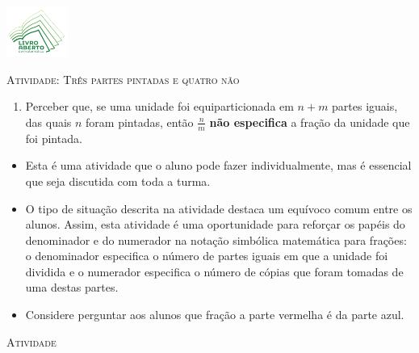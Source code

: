 \documentclass[10 pt,usenames,dvipsnames, oneside]{article}
\begin{document}
\begin{center}
  \begin{minipage}[l]{3cm}
\includegraphics[width=2cm]{logo}    
\end{minipage}\hfill
\begin{minipage}[r]{.8\textwidth}
 {\Large \scshape Atividade: Três partes pintadas e quatro não}  
\end{minipage}
\end{center}
\vspace{.2cm}

\ifdefined\prof
\begin{goals}
\begin{enumerate}

    \item Perceber que, se uma unidade foi equiparticionada em $n + m$ partes iguais, das quais $n$ foram pintadas, então $\frac{n}{m}$ {\bf não especifica} a fração da unidade que foi pintada.

\end{enumerate}
\tcblower

\begin{itemize} %
    \item       Esta é uma atividade que o aluno pode fazer individualmente, mas é essencial que seja discutida com toda a turma.
    \item       O tipo de situação descrita na atividade destaca um equívoco comum entre os alunos. Assim, esta atividade é uma oportunidade para reforçar os papéis do denominador e do numerador na notação simbólica matemática para frações: o denominador especifica o número de partes iguais em que a unidade foi dividida e o numerador especifica o número de cópias que foram tomadas de uma destas partes.
      \item Considere perguntar aos alunos que fração a parte vermelha é da parte azul.

\end{itemize} %

\end{goals}

\bigskip
\begin{center}
{\large \scshape Atividade}
\end{center}
\fi
\end{document}

